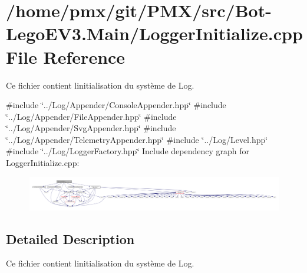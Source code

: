 \hypertarget{Bot-LegoEV3_8Main_2LoggerInitialize_8cpp}{}\section{/home/pmx/git/\+P\+M\+X/src/\+Bot-\/\+Lego\+E\+V3.Main/\+Logger\+Initialize.cpp File Reference}
\label{Bot-LegoEV3_8Main_2LoggerInitialize_8cpp}


Ce fichier contient l\textquotesingle{}initialisation du système de Log.  


{\ttfamily \#include \char`\"{}../\+Log/\+Appender/\+Console\+Appender.\+hpp\char`\"{}}\newline
{\ttfamily \#include \char`\"{}../\+Log/\+Appender/\+File\+Appender.\+hpp\char`\"{}}\newline
{\ttfamily \#include \char`\"{}../\+Log/\+Appender/\+Svg\+Appender.\+hpp\char`\"{}}\newline
{\ttfamily \#include \char`\"{}../\+Log/\+Appender/\+Telemetry\+Appender.\+hpp\char`\"{}}\newline
{\ttfamily \#include \char`\"{}../\+Log/\+Level.\+hpp\char`\"{}}\newline
{\ttfamily \#include \char`\"{}../\+Log/\+Logger\+Factory.\+hpp\char`\"{}}\newline
Include dependency graph for Logger\+Initialize.\+cpp\+:
\nopagebreak
\begin{figure}[H]
\begin{center}
\leavevmode
\includegraphics[width=350pt]{Bot-LegoEV3_8Main_2LoggerInitialize_8cpp__incl}
\end{center}
\end{figure}


\subsection{Detailed Description}
Ce fichier contient l\textquotesingle{}initialisation du système de Log. 

